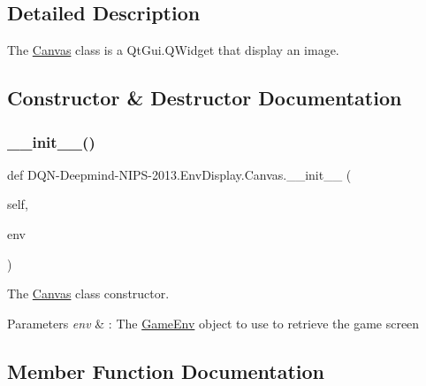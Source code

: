 \subsection{Detailed Description}
The \hyperlink{classDQN-Deepmind-NIPS-2013_1_1EnvDisplay_1_1Canvas}{Canvas} class is a Qt\+Gui.\+Q\+Widget that display an image. 

\subsection{Constructor \& Destructor Documentation}
\hypertarget{classDQN-Deepmind-NIPS-2013_1_1EnvDisplay_1_1Canvas_ae4988f04f58e179d82925dd7b6157ee7}{}\label{classDQN-Deepmind-NIPS-2013_1_1EnvDisplay_1_1Canvas_ae4988f04f58e179d82925dd7b6157ee7} 
\subsubsection{\texorpdfstring{\+\_\+\+\_\+init\+\_\+\+\_\+()}{\_\_init\_\_()}}
{\footnotesize\ttfamily def D\+QN-\/Deepmind-\/N\+I\+PS-\/2013.Env\+Display.\+Canvas.\+\_\+\+\_\+init\+\_\+\+\_\+ (\begin{DoxyParamCaption}\item[{}]{self,  }\item[{}]{env }\end{DoxyParamCaption})}



The \hyperlink{classDQN-Deepmind-NIPS-2013_1_1EnvDisplay_1_1Canvas}{Canvas} class constructor. 


\begin{DoxyParams}{Parameters}
{\em env} & \+: The \hyperlink{namespaceDQN-Deepmind-NIPS-2013_1_1GameEnv}{Game\+Env} object to use to retrieve the game screen \\
\hline
\end{DoxyParams}


\subsection{Member Function Documentation}
\hypertarget{classDQN-Deepmind-NIPS-2013_1_1EnvDisplay_1_1Canvas_a6225ff0fed4f12c11640877f04286c91}{}\label{classDQN-Deepmind-NIPS-2013_1_1EnvDisplay_1_1Canvas_a6225ff0fed4f12c11640877f04286c91} 
